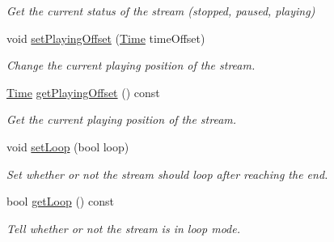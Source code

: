 \begin{DoxyCompactItemize}
\begin{DoxyCompactList}\small\item\em Get the current status of the stream (stopped, paused, playing) \end{DoxyCompactList}\item 
void \hyperlink{classsf_1_1_sound_stream_af416a5f84c8750d2acb9821d78bc8646}{set\+Playing\+Offset} (\hyperlink{classsf_1_1_time}{Time} time\+Offset)
\begin{DoxyCompactList}\small\item\em Change the current playing position of the stream. \end{DoxyCompactList}\item 
\hyperlink{classsf_1_1_time}{Time} \hyperlink{classsf_1_1_sound_stream_ae288f3c72edbad9cc7ee938ce5b907c1}{get\+Playing\+Offset} () const
\begin{DoxyCompactList}\small\item\em Get the current playing position of the stream. \end{DoxyCompactList}\item 
void \hyperlink{classsf_1_1_sound_stream_a43fade018ffba7e4f847a9f00b353f3d}{set\+Loop} (bool loop)
\begin{DoxyCompactList}\small\item\em Set whether or not the stream should loop after reaching the end. \end{DoxyCompactList}\item 
bool \hyperlink{classsf_1_1_sound_stream_a49d263f9bbaefec4b019bd05fda59b25}{get\+Loop} () const
\begin{DoxyCompactList}\small\item\em Tell whether or not the stream is in loop mode. \end{DoxyCompactList}\end{DoxyCompactItemize}

